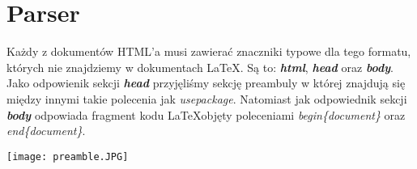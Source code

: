 \section{Parser}

Każdy z dokumentów HTML'a musi zawierać znaczniki typowe dla tego formatu, których nie znajdziemy w dokumentach \LaTeX. Są to: \textbf{\textit{html}},
\textbf{\textit{head}} oraz \textbf{\textit{body}}. Jako odpowienik sekcji \textbf{\textit{head}} przyjęliśmy sekcję preambuly w której 
znajdują się między innymi takie polecenia jak \textit{usepackage}. Natomiast jak odpowiednik sekcji \textbf{\textit{body}} odpowiada fragment kodu 
\LaTeX \space objęty poleceniami \textit{begin\{document\}} oraz \textit{end\{document\}}.

\texttt{[image: preamble.JPG]}











